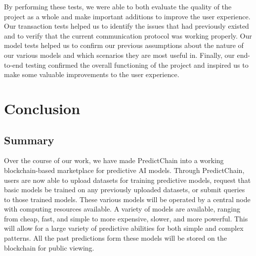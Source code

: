 \documentclass{ledger}
\begin{document}
By performing these tests, we were able to both evaluate the quality of the project as a whole and make important
additions to improve the user experience.  Our transaction tests helped us to identify the issues that had
previously existed and to verify that the current communication protocol was working properly.  Our model tests
helped us to confirm our previous assumptions about the nature of our various models and which scenarios they are
most useful in.  Finally, our end-to-end testing confirmed the overall functioning of the project and inspired us
to make some valuable improvements to the user experience.

\section{Conclusion}

\subsection{Summary}

Over the course of our work, we have made PredictChain into a working blockchain-based marketplace for predictive AI models.
Through PredictChain, users are now able to upload datasets for training predictive models, request that basic models
be trained on any previously uploaded datasets, or submit queries to those trained models.
These various models will be operated by a central node with computing resources available. A variety of
models are available, ranging from cheap, fast, and simple to more expensive, slower, and more powerful.
This will allow for a large variety of predictive abilities for both simple and complex patterns.  All the past predictions
form these models will be stored on the blockchain for public viewing.

%
%
%
\end{document}
